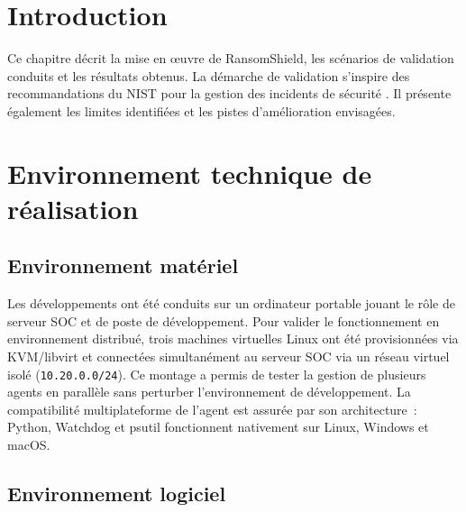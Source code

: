 
{}
\section*{Introduction}

Ce chapitre décrit la mise en \oe{}uvre de RansomShield, les scénarios de validation conduits et les résultats obtenus. La démarche de validation s'inspire des recommandations du NIST pour la gestion des incidents de sécurité \cite{nistIncidentResponse2024}. Il présente également les limites identifiées et les pistes d'amélioration envisagées.

\section{Environnement technique de réalisation}

\subsection{Environnement matériel}

Les développements ont été conduits sur un ordinateur portable jouant le rôle de serveur SOC et de poste de développement. Pour valider le fonctionnement en environnement distribué, trois machines virtuelles Linux ont été provisionnées via KVM/libvirt et connectées simultanément au serveur SOC via un réseau virtuel isolé (\texttt{10.20.0.0/24}). Ce montage a permis de tester la gestion de plusieurs agents en parallèle sans perturber l'environnement de développement. La compatibilité multiplateforme de l'agent est assurée par son architecture~: Python, Watchdog et psutil fonctionnent nativement sur Linux, Windows et macOS.

\subsection{Environnement logiciel}

